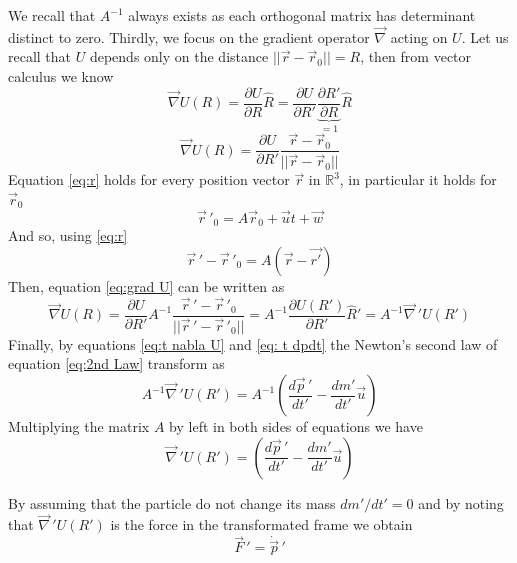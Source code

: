 \documentclass[11pt, letterpaper]{article}
\def\Re{\mathbb{R}}
\begin{document}
We recall that $A^{-1}$ always exists as each orthogonal matrix has determinant distinct to zero. Thirdly, we focus on the gradient operator $\vec{\nabla}$ acting on $U$. Let us recall that $U$ depends only on the distance $||\vec{r}-\vec{r}_0||=R$, then from vector calculus we know
\begin{equation}
	\vec{\nabla}U(R)=\frac{\partial U}{\partial R}\hat{R}=\frac{\partial U}{\partial R'}\underbrace{\frac{\partial R'}{\partial R}}_{=1} \hat{R}
\end{equation}
\begin{equation}
	\vec{\nabla}U(R) = \frac{\partial U}{\partial R'} \frac{\vec{r}-\vec{r}_0}{|| \vec{r}-\vec{r}_0 ||} \label{eq:grad U}
\end{equation}
Equation \ref{eq:r} holds for every position vector $\vec{r}$ in $\Re^3$, in particular it holds for $\vec{r}_0$
\begin{equation}
	\vec{r}\,'_0 = A \vec{r}_0+\vec{u}t+\vec{w}
\end{equation}
And so, using \ref{eq:r}
\begin{equation}
	\vec{r}\,'-\vec{r}\,'_0 = A(\vec{r}-\vec{r'}) \label{eq:difference r}
\end{equation}
Then, equation \ref{eq:grad U} can be written as
\begin{equation}
	\vec{\nabla} U(R)  = \frac{\partial  U}{\partial R'} A^{-1} \frac{\vec{r}\,'-\vec{r}\,'_0}{|| \vec{r}\,'-\vec{r}\,'_0 ||} = A^{-1} \frac{\partial U(R')}{\partial R'} \hat{R}'=A^{-1}\vec{\nabla}\,'U(R') \label{eq:t nabla U}
\end{equation}
Finally, by equations \ref{eq:t nabla U} and \ref{eq: t dpdt} the Newton's second law of equation \ref{eq:2nd Law} transform as
\begin{equation}
	A^{-1}\vec{\nabla}\,'U(R') = A^{-1}\left( \frac{d\vec{p}\,'}{dt'}-\frac{dm'}{dt'}\vec{u}\right)
\end{equation}
Multiplying the matrix $A$ by left in both sides of equations we have
\begin{equation}
	\vec{\nabla}\,'U(R') = \left( \frac{d\vec{p}\,'}{dt'}-\frac{dm'}{dt'}\vec{u}\right)
\end{equation}

By assuming that the particle do not change its mass $dm' / dt'=0$ and by noting that $\vec{\nabla}\,'U(R')$ is the force in the transformated frame we obtain
\begin{equation}
	\vec{F}\,' = \dot{\vec{p}}\,' \label{eq: F' = dot p'}
\end{equation}
\end{document}
